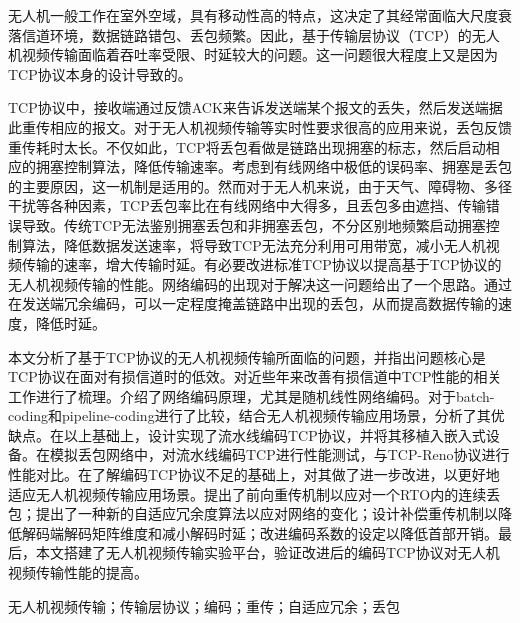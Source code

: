 \cabstract
{
无人机一般工作在室外空域，具有移动性高的特点，这决定了其经常面临大尺度衰落信道环境，数据链路错包、丢包频繁。因此，基于传输层协议（TCP）的无人机视频传输面临着吞吐率受限、时延较大的问题。这一问题很大程度上又是因为TCP协议本身的设计导致的。
	\par
TCP协议中，接收端通过反馈ACK来告诉发送端某个报文的丢失，然后发送端据此重传相应的报文。对于无人机视频传输等实时性要求很高的应用来说，丢包反馈重传耗时太长。不仅如此，TCP将丢包看做是链路出现拥塞的标志，然后启动相应的拥塞控制算法，降低传输速率。考虑到有线网络中极低的误码率、拥塞是丢包的主要原因，这一机制是适用的。然而对于无人机来说，由于天气、障碍物、多径干扰等各种因素，TCP丢包率比在有线网络中大得多，且丢包多由遮挡、传输错误导致。传统TCP无法鉴别拥塞丢包和非拥塞丢包，不分区别地频繁启动拥塞控制算法，降低数据发送速率，将导致TCP无法充分利用可用带宽，减小无人机视频传输的速率，增大传输时延。有必要改进标准TCP协议以提高基于TCP协议的无人机视频传输的性能。网络编码的出现对于解决这一问题给出了一个思路。通过在发送端冗余编码，可以一定程度掩盖链路中出现的丢包，从而提高数据传输的速度，降低时延。
	\par
本文分析了基于TCP协议的无人机视频传输所面临的问题，并指出问题核心是TCP协议在面对有损信道时的低效。对近些年来改善有损信道中TCP性能的相关工作进行了梳理。介绍了网络编码原理，尤其是随机线性网络编码。对于batch-coding和pipeline-coding进行了比较，结合无人机视频传输应用场景，分析了其优缺点。在以上基础上，设计实现了流水线编码TCP协议，并将其移植入嵌入式设备。在模拟丢包网络中，对流水线编码TCP进行性能测试，与TCP-Reno协议进行性能对比。在了解编码TCP协议不足的基础上，对其做了进一步改进，以更好地适应无人机视频传输应用场景。提出了前向重传机制以应对一个RTO内的连续丢包；提出了一种新的自适应冗余度算法以应对网络的变化；设计补偿重传机制以降低解码端解码矩阵维度和减小解码时延；改进编码系数的设定以降低首部开销。最后，本文搭建了无人机视频传输实验平台，验证改进后的编码TCP协议对无人机视频传输性能的提高。
	\par
	
}
{无人机视频传输；传输层协议；编码；重传；自适应冗余；丢包} 	%